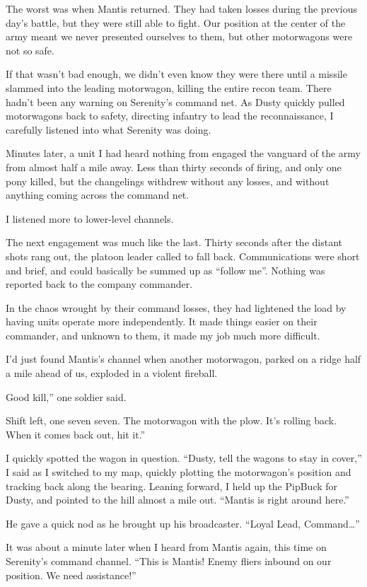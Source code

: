The worst was when Mantis returned. They had taken losses during the previous day’s battle, but they were still able to fight. Our position at the center of the army meant we never presented ourselves to them, but other motorwagons were not so safe.

If that wasn’t bad enough, we didn’t even know they were there until a missile slammed into the leading motorwagon, killing the entire recon team. There hadn’t been any warning on Serenity’s command net. As Dusty quickly pulled motorwagons back to safety, directing infantry to lead the reconnaissance, I carefully listened into what Serenity was doing.

Minutes later, a unit I had heard nothing from engaged the vanguard of the army from almost half a mile away. Less than thirty seconds of firing, and only one pony killed, but the changelings withdrew without any losses, and without anything coming across the command net.

I listened more to lower-level channels.

The next engagement was much like the last. Thirty seconds after the distant shots rang out, the platoon leader called to fall back. Communications were short and brief, and could basically be summed up as “follow me”. Nothing was reported back to the company commander.

In the chaos wrought by their command losses, they had lightened the load by having units operate more independently. It made things easier on their commander, and unknown to them, it made my job much more difficult.

I’d just found Mantis’s channel when another motorwagon, parked on a ridge half a mile ahead of us, exploded in a violent fireball.

\leavevmode{}Good kill,” one soldier said.

\leavevmode{}Shift left, one seven seven. The motorwagon with the plow. It’s rolling back. When it comes back out, hit it.”

I quickly spotted the wagon in question. “Dusty, tell the wagons to stay in cover,” I said as I switched to my map, quickly plotting the motorwagon’s position and tracking back along the bearing. Leaning forward, I held up the PipBuck for Dusty, and pointed to the hill almost a mile out. “Mantis is right around here.”

He gave a quick nod as he brought up his broadcaster. “Loyal Lead, Command…”

It was about a minute later when I heard from Mantis again, this time on Serenity’s command channel. “This is Mantis! Enemy fliers inbound on our position. We need assistance!”

